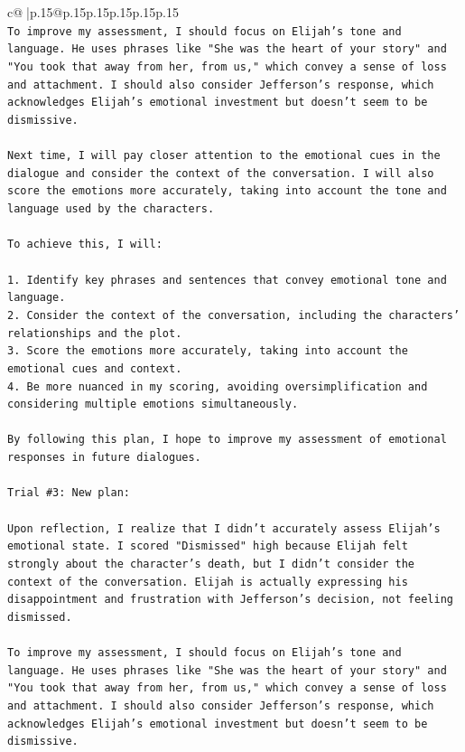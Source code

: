 \documentclass{article}
\begin{document}
{\begin{supertabular}{c@{$\;$}|p{.15\linewidth}@{}p{.15\linewidth}p{.15\linewidth}p{.15\linewidth}p{.15\linewidth}p{.15\linewidth}}
{{{\\ 
\texttt{To improve my assessment, I should focus on Elijah's tone and language. He uses phrases like "She was the heart of your story" and "You took that away from her, from us," which convey a sense of loss and attachment. I should also consider Jefferson's response, which acknowledges Elijah's emotional investment but doesn't seem to be dismissive. } \\
\\ 
\texttt{Next time, I will pay closer attention to the emotional cues in the dialogue and consider the context of the conversation. I will also score the emotions more accurately, taking into account the tone and language used by the characters.} \\
\\ 
\texttt{To achieve this, I will:} \\
\\ 
\texttt{1. Identify key phrases and sentences that convey emotional tone and language.} \\
\texttt{2. Consider the context of the conversation, including the characters' relationships and the plot.} \\
\texttt{3. Score the emotions more accurately, taking into account the emotional cues and context.} \\
\texttt{4. Be more nuanced in my scoring, avoiding oversimplification and considering multiple emotions simultaneously.} \\
\\ 
\texttt{By following this plan, I hope to improve my assessment of emotional responses in future dialogues.} \\
\\ 
\texttt{Trial \#3: New plan: } \\
\\ 
\texttt{Upon reflection, I realize that I didn't accurately assess Elijah's emotional state. I scored "Dismissed" high because Elijah felt strongly about the character's death, but I didn't consider the context of the conversation. Elijah is actually expressing his disappointment and frustration with Jefferson's decision, not feeling dismissed. } \\
\\ 
\texttt{To improve my assessment, I should focus on Elijah's tone and language. He uses phrases like "She was the heart of your story" and "You took that away from her, from us," which convey a sense of loss and attachment. I should also consider Jefferson's response, which acknowledges Elijah's emotional investment but doesn't seem to be dismissive. } \\
}}}
\end{supertabular}}
\end{document}
